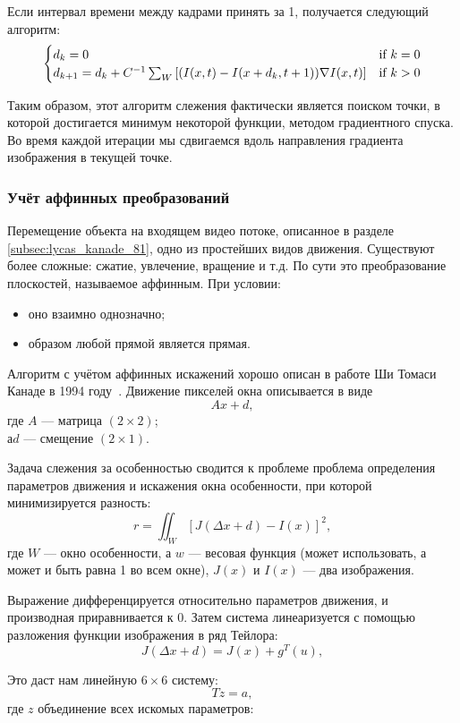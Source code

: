 Если интервал времени между кадрами принять за 1, получается следующий алгоритм:
\begin{equation}
\numberwithin{equation}{section}
\label{eq:alg_pyr}
\begin{cases} d_k = 0 &\mbox{if } k = 0 \\
d_{k+1}=d_k + C^{-1} \sum_W \left[ (I(x,t) - I(x+d_k,t + 1)) \nabla I (x,t) \right] & \mbox{if } k > 0 \end{cases}
\end{equation}

Таким образом, этот алгоритм слежения фактически является поиском точки, в которой достигается минимум некоторой функции, методом градиентного спуска. Во время каждой итерации мы сдвигаемся вдоль направления градиента изображения в текущей точке.
\subsubsection{Учёт аффинных преобразований}
Перемещение объекта на входящем видео потоке, описанное в разделе \ref{subsec:lycas_kanade_81}, одно из простейших видов движения. Существуют более сложные: сжатие, увлечение, вращение и т.д. По сути это преобразование плоскостей, называемое аффинным. При условии:
\begin{itemize}
\item оно взаимно однозначно;
\item образом любой прямой является прямая.
\end{itemize}

Алгоритм с учётом аффинных искажений хорошо описан в работе Ши Томаси Канаде в 1994 году~\cite{shi_tom_lyk}. Движение пикселей окна описывается в виде $$Ax + d,$$
где $A$ — матрица $(2 \times 2)$;\\
$а d$ — смещение $(2 \times 1)$.

Задача слежения за особенностью сводится к проблеме проблема определения параметров движения и искажения окна особенности, при которой минимизируется разность:
$$r=\iint_W [J(\Delta x+d)-I(x)]^2,$$
где $W$ — окно особенности, а $w$ — весовая функция (может использовать, а может и быть равна 1 во всем окне), $J(x)$ и $I(x)$ — два изображения.

Выражение дифференцируется относительно параметров движения, и производная приравнивается к 0. Затем система линеаризуется с помощью разложения функции изображения в ряд Тейлора:
$$J(\Delta x+d)= J(x)+g^T(u),$$

Это даст нам линейную $6 \times 6$ систему:
$$Tz=a,$$
где $z$ объединение всех искомых параметров:

